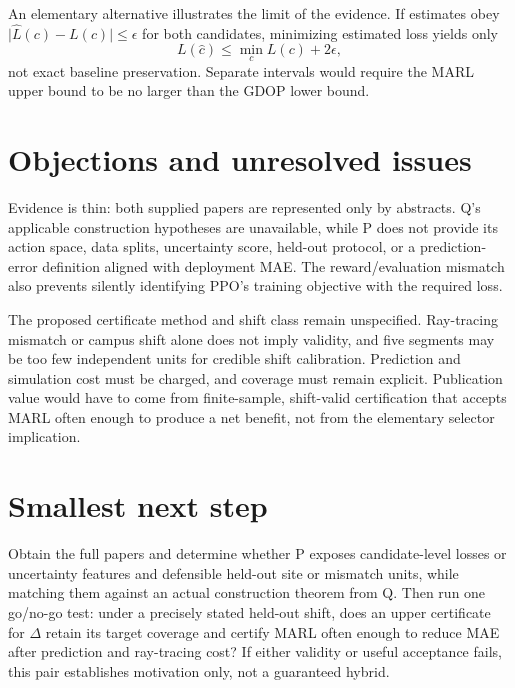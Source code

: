 \documentclass{article}
\begin{document}
An elementary alternative illustrates the limit of the evidence.  If estimates obey \(\lvert\widehat L(c)-L(c)\rvert\leq\epsilon\) for both candidates, minimizing estimated loss yields only
\[
  L(\widehat c)\leq \min_c L(c)+2\epsilon,
\]
not exact baseline preservation.  Separate intervals would require the MARL upper bound to be no larger than the GDOP lower bound. 

\section{Objections and unresolved issues}

Evidence is thin: both supplied papers are represented only by abstracts.  Q's applicable construction hypotheses are unavailable, while P does not provide its action space, data splits, uncertainty score, held-out protocol, or a prediction-error definition aligned with deployment MAE.  The reward/evaluation mismatch also prevents silently identifying PPO's training objective with the required loss. 

The proposed certificate method and shift class remain unspecified.  Ray-tracing mismatch or campus shift alone does not imply validity, and five segments may be too few independent units for credible shift calibration.  Prediction and simulation cost must be charged, and coverage must remain explicit.  Publication value would have to come from finite-sample, shift-valid certification that accepts MARL often enough to produce a net benefit, not from the elementary selector implication. 

\section{Smallest next step}

Obtain the full papers and determine whether P exposes candidate-level losses or uncertainty features and defensible held-out site or mismatch units, while matching them against an actual construction theorem from Q.  Then run one go/no-go test: under a precisely stated held-out shift, does an upper certificate for \(\Delta\) retain its target coverage and certify MARL often enough to reduce MAE after prediction and ray-tracing cost?  If either validity or useful acceptance fails, this pair establishes motivation only, not a guaranteed hybrid. 
\end{document}
